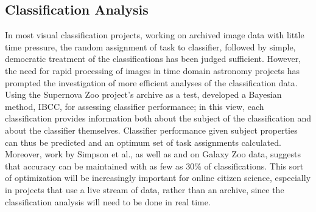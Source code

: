 \documentclass{ar2e}
\begin{document}

\subsection{Classification Analysis}
\label{sec:class:analysis}

In most visual classification projects, working on archived image data with
little time pressure, the random assignment of task to classifier, followed by
simple, democratic treatment of the classifications has been judged sufficient.
However, the need for rapid processing of images in time domain astronomy
projects has prompted the investigation of more efficient analyses of the
classification data.  Using the Supernova Zoo project's archive as a test,
\citet{Simpson++2012IBCC} developed a Bayesian method, IBCC, for assessing
classifier performance; in this view, each classification provides information
both about the subject of the classification and about the classifier
themselves. Classifier performance given subject properties can thus be
predicted and an optimum set of task assignments calculated. 
Moreover, work by Simpson et al., as well as \citet{Kamar} and \citet{Waterhouse} on
Galaxy Zoo data, suggests that accuracy can be maintained with as few as 30\% of
classifications. 
This sort of optimization will be increasingly important for online citizen
science, especially in projects that use a live stream of data, rather than
an archive, since the classification analysis will need to be done in real time.


\end{document}
